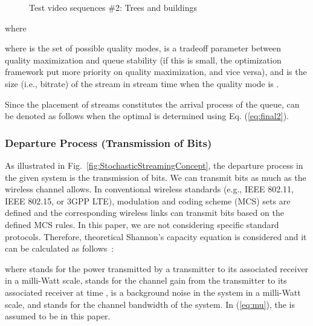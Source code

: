 \documentclass[conference]{IEEEtran}
\begin{document}
\begin{figure*}[t!]
	\centering
	\caption{Test video sequences \#2: Trees and buildings}
	\label{fig:sim2}
\end{figure*}


where

where
     is the set of possible quality modes,
     is a tradeoff parameter between quality maximization and queue stability (if this  is small, the optimization framework put more priority on quality maximization, and vice versa), and
     is the size (i.e., bitrate) of the stream in stream time  when the quality mode is .

Since the placement of streams constitutes the arrival process of the queue,
 can be denoted as follows when the optimal  is determined using Eq. (\ref{eq:final2}).




\subsubsection{Departure Process (Transmission of Bits)}\label{sec:streaming-departure}
As illustrated in Fig.~\ref{fig:StochasticStreamingConcept}, the departure process in the given system is the transmission of bits.
We can transmit bits as much as the wireless channel allows.
In conventional wireless standards (e.g., IEEE 802.11, IEEE 802.15, or 3GPP LTE), modulation and coding scheme (MCS) sets are defined and the corresponding wireless links can transmit bits based on the defined MCS rules.
In this paper, we are not considering specific standard protocols. Therefore, theoretical Shannon's capacity equation is considered and it can be calculated as follows~\cite{book2011molisch}:

where
     stands for the power transmitted by a transmitter to its associated receiver in a milli-Watt scale,
     stands for the channel gain from the transmitter to its associated receiver at time ,
     is a background noise in the system in a milli-Watt scale,
    and
     stands for the channel bandwidth of the system.
In (\ref{eq:mu}), the  is assumed to be  in this paper.
\end{document}

